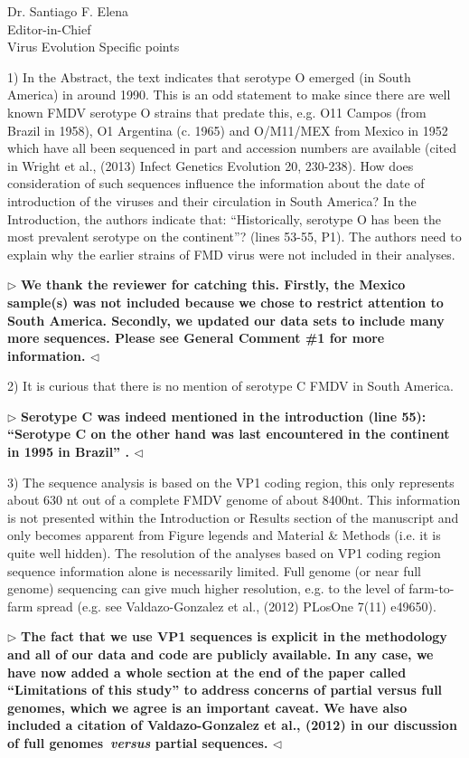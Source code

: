 \documentclass[12pt, a4paper]{letter} %
\newenvironment{reply}{$\triangleright$\bf}{$\triangleleft$}
\begin{document}
\begin{letter}{
	Dr. Santiago F. Elena\\
    Editor-in-Chief \\
    Virus Evolution
}
Specific points

1)      In the Abstract, the text indicates that serotype O emerged (in South America) in around 1990. 
This is an odd statement to make since there are well known FMDV serotype O strains that predate this, e.g. O11 Campos (from Brazil in 1958), O1 Argentina (c. 1965) and O/M11/MEX from Mexico in 1952 which have all been sequenced in part and accession numbers are available (cited in Wright et al., (2013) Infect Genetics Evolution 20, 230-238).  
How does consideration of such sequences influence the information about the date of introduction of the viruses and their circulation in South America? 
In the Introduction, the authors indicate that: ``Historically, serotype O has been the most prevalent serotype on the continent''? (lines 53-55, P1). 
The authors need to explain why the earlier strains of FMD virus were not included in their analyses.

\begin{reply}
We thank the reviewer for catching this.
Firstly, the Mexico sample(s) was not included because we chose to restrict attention to South America.
Secondly, we updated our data sets to include many more sequences.
Please see General Comment \#1 for more information.
\end{reply}

2)      It is curious that there is no mention of serotype C FMDV in South America.

\begin{reply}
Serotype C was indeed mentioned in the introduction (line 55): ``Serotype C on the other hand was last encountered in the continent in 1995 in Brazil'' .
\end{reply}

3)      The sequence analysis is based on the VP1 coding region, this only represents about 630 nt out of a complete FMDV genome of about 8400nt. 
This information is not presented within the Introduction or Results section of the manuscript and only becomes apparent from Figure legends and Material \& Methods (i.e. it is quite well hidden). 
The resolution of the analyses based on VP1 coding region sequence information alone is necessarily limited. 
Full genome (or near full genome) sequencing can give much higher resolution, e.g. to the level of farm-to-farm spread (e.g. see Valdazo-Gonzalez et al., (2012) PLosOne 7(11) e49650).

\begin{reply}
The fact that we use VP1 sequences is explicit in the methodology and all of our data and code are publicly available.
In any case, we have now added a whole section at the end of the paper called ``Limitations of this study'' to address concerns of partial versus full genomes, which we agree is an important caveat.
We have also included a citation of Valdazo-Gonzalez et al., (2012) in our discussion of full genomes~\textit{versus} partial sequences.
\end{reply}


\end{letter}
\end{document}
